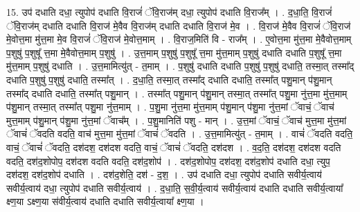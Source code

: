 \documentclass[17pt]{extarticle}
\begin{document}
15. उप॑ दधाति दधा॒ त्युपोप॑ दधाति वि॒राजं॑ ॅवि॒राज॑म् दधा॒ त्युपोप॑ दधाति वि॒राज᳚म् । . द॒धा॒ति॒ वि॒राजं॑ ॅवि॒राज॑म् दधाति दधाति वि॒राज॑ मे॒वैव वि॒राज॑म् दधाति दधाति वि॒राज॑ मे॒व । . वि॒राज॑ मे॒वैव वि॒राजं॑ ॅवि॒राज॑ मे॒वोत्त॒मा मु॑त्त॒मा मे॒व वि॒राजं॑ ॅवि॒राज॑ मे॒वोत्त॒माम् । . वि॒राज॒मिति॑ वि - राज᳚म् । . ए॒वोत्त॒मा मु॑त्त॒मा मे॒वैवोत्त॒माम् प॒शुषु॑ प॒शुषू᳚ त्त॒मा मे॒वैवोत्त॒माम् प॒शुषु॑ । . उ॒त्त॒माम् प॒शुषु॑ प॒शुषू᳚ त्त॒मा मु॑त्त॒माम् प॒शुषु॑ दधाति दधाति प॒शुषू᳚ त्त॒मा मु॑त्त॒माम् प॒शुषु॑ दधाति । . उ॒त्त॒मामित्यु॑त् - त॒माम् । . प॒शुषु॑ दधाति दधाति प॒शुषु॑ प॒शुषु॑ दधाति॒ तस्मा॒त् तस्मा᳚द् दधाति प॒शुषु॑ प॒शुषु॑ दधाति॒ तस्मा᳚त् । . द॒धा॒ति॒ तस्मा॒त् तस्मा᳚द् दधाति दधाति॒ तस्मा᳚त् पशु॒मान् प॑शु॒मान् तस्मा᳚द् दधाति दधाति॒ तस्मा᳚त् पशु॒मान् । . तस्मा᳚त् पशु॒मान् प॑शु॒मान् तस्मा॒त् तस्मा᳚त् पशु॒मा नु॑त्त॒मा मु॑त्त॒माम् प॑शु॒मान् तस्मा॒त् तस्मा᳚त् पशु॒मा नु॑त्त॒माम् । . प॒शु॒मा नु॑त्त॒मा मु॑त्त॒माम् प॑शु॒मान् प॑शु॒मा नु॑त्त॒मां ॅवाचं॒ ॅवाच॑ मुत्त॒माम् प॑शु॒मान् प॑शु॒मा नु॑त्त॒मां ॅवाच᳚म् । . प॒शु॒मानिति॑ पशु - मान् । . उ॒त्त॒मां ॅवाचं॒ ॅवाच॑ मुत्त॒मा मु॑त्त॒मां ॅवाचं॑ ॅवदति वदति॒ वाच॑ मुत्त॒मा मु॑त्त॒मां ॅवाचं॑ ॅवदति । . उ॒त्त॒मामित्यु॑त् - त॒माम् । . वाचं॑ ॅवदति वदति॒ वाचं॒ ॅवाचं॑ ॅवदति॒ दश॑दश॒ दश॑दश वदति॒ वाचं॒ ॅवाचं॑ ॅवदति॒ दश॑दश । . व॒द॒ति॒ दश॑दश॒ दश॑दश वदति वदति॒ दश॑द॒शोपोप॒ दश॑दश वदति वदति॒ दश॑द॒शोप॑ । . दश॑द॒शोपोप॒ दश॑दश॒ दश॑द॒शोप॑ दधाति दधा॒ त्युप॒ दश॑दश॒ दश॑द॒शोप॑ दधाति । . दश॑द॒शेति॒ दश॑ - द॒श॒ । . उप॑ दधाति दधा॒ त्युपोप॑ दधाति सवीर्य॒त्वाय॑ सवीर्य॒त्वाय॑ दधा॒ त्युपोप॑ दधाति सवीर्य॒त्वाय॑ । . द॒धा॒ति॒ स॒वी॒र्य॒त्वाय॑ सवीर्य॒त्वाय॑ दधाति दधाति सवीर्य॒त्वाया᳚ क्ष्ण॒या ऽक्ष्ण॒या स॑वीर्य॒त्वाय॑ दधाति दधाति सवीर्य॒त्वाया᳚ क्ष्ण॒या । \newline
\end{document}
